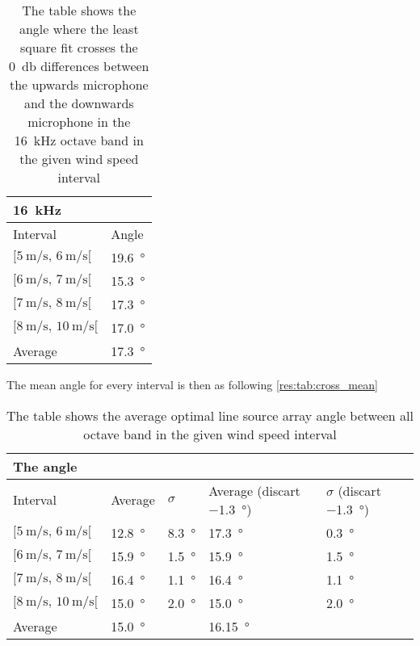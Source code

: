  \begin{table}[H]
 \centering
  \caption{The table shows the angle where the least square fit crosses the \SI{0}{\decibel} differences between the upwards microphone and the downwards microphone in the \SI{16}{\kilo\hertz} octave band in the given wind speed interval}
\begin{tabular}{l|l}
\multicolumn{2}{l}{\SI{16}{\kilo\hertz}}      \\ \hline
Interval & Angle \\ \hline
  $[\SI{5}{\meter\per\second},\, \SI{6}{\meter\per\second}[ $       &   \SI{19.6}{\degree}    \\
    $[\SI{6}{\meter\per\second},\, \SI{7}{\meter\per\second}[ $     &   \SI{15.3}{\degree}     \\
  $[\SI{7}{\meter\per\second},\, \SI{8}{\meter\per\second}[ $       &    \SI{17.3}{\degree}    \\
   $[\SI{8}{\meter\per\second},\, \SI{10}{\meter\per\second}[ $      &     \SI{17.0}{\degree}  \\ \hline
    Average      &     \SI{17.3}{\degree} 
\end{tabular}
\label{res:tab:cross_16k}
\end{table}    
 
 
The mean angle for every interval is then as following \autoref{res:tab:cross_mean}

  \begin{table}[H]
 \centering
  \caption{The table shows the average optimal line source array angle between all octave band  in the given wind speed interval}
\begin{tabular}{l|l|l|l|l}
\multicolumn{2}{l}{The angle}      \\ \hline
Interval & Average  & $\sigma$ & Average (discart  \SI{-1.3}{\degree}) & $\sigma$ (discart  \SI{-1.3}{\degree}) \\ \hline
  $[\SI{5}{\meter\per\second},\, \SI{6}{\meter\per\second}[ $       &   \SI{12.8}{\degree}  &   \SI{8.3}{\degree}  &   \SI{17.3}{\degree}   &   \SI{0.3}{\degree}\\
    $[\SI{6}{\meter\per\second},\, \SI{7}{\meter\per\second}[ $     &   \SI{15.9}{\degree}   &   \SI{1.5}{\degree} &   \SI{15.9}{\degree}   &   \SI{1.5}{\degree}\\
  $[\SI{7}{\meter\per\second},\, \SI{8}{\meter\per\second}[ $       &    \SI{16.4}{\degree}  &   \SI{1.1}{\degree} &    \SI{16.4}{\degree}&    \SI{1.1}{\degree}  \\
   $[\SI{8}{\meter\per\second},\, \SI{10}{\meter\per\second}[ $      &     \SI{15.0}{\degree}  &   \SI{2.0}{\degree} &     \SI{15.0}{\degree} &     \SI{2.0}{\degree} \\ \hline
    Average      &     \SI{15.0}{\degree} &  &\SI{16.15}{\degree}&
\end{tabular}
\label{res:tab:cross_mean}
\end{table}  
 
